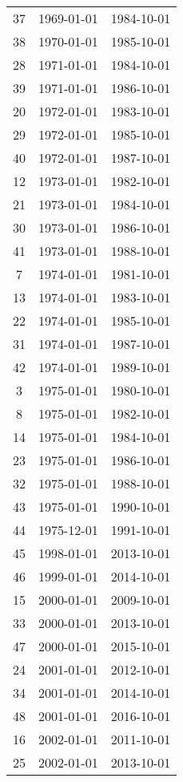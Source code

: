 % 
\begin{tabular}{ccc}
  \hline
  \hline
37 & 1969-01-01 & 1984-10-01 \\ 
  38 & 1970-01-01 & 1985-10-01 \\ 
  28 & 1971-01-01 & 1984-10-01 \\ 
  39 & 1971-01-01 & 1986-10-01 \\ 
  20 & 1972-01-01 & 1983-10-01 \\ 
  29 & 1972-01-01 & 1985-10-01 \\ 
  40 & 1972-01-01 & 1987-10-01 \\ 
  12 & 1973-01-01 & 1982-10-01 \\ 
  21 & 1973-01-01 & 1984-10-01 \\ 
  30 & 1973-01-01 & 1986-10-01 \\ 
  41 & 1973-01-01 & 1988-10-01 \\ 
  7 & 1974-01-01 & 1981-10-01 \\ 
  13 & 1974-01-01 & 1983-10-01 \\ 
  22 & 1974-01-01 & 1985-10-01 \\ 
  31 & 1974-01-01 & 1987-10-01 \\ 
  42 & 1974-01-01 & 1989-10-01 \\ 
  3 & 1975-01-01 & 1980-10-01 \\ 
  8 & 1975-01-01 & 1982-10-01 \\ 
  14 & 1975-01-01 & 1984-10-01 \\ 
  23 & 1975-01-01 & 1986-10-01 \\ 
  32 & 1975-01-01 & 1988-10-01 \\ 
  43 & 1975-01-01 & 1990-10-01 \\ 
  44 & 1975-12-01 & 1991-10-01 \\ 
  45 & 1998-01-01 & 2013-10-01 \\ 
  46 & 1999-01-01 & 2014-10-01 \\ 
  15 & 2000-01-01 & 2009-10-01 \\ 
  33 & 2000-01-01 & 2013-10-01 \\ 
  47 & 2000-01-01 & 2015-10-01 \\ 
  24 & 2001-01-01 & 2012-10-01 \\ 
  34 & 2001-01-01 & 2014-10-01 \\ 
  48 & 2001-01-01 & 2016-10-01 \\ 
  16 & 2002-01-01 & 2011-10-01 \\ 
  25 & 2002-01-01 & 2013-10-01 \\ 

\end{tabular}
